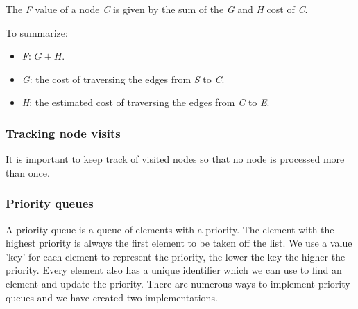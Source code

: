 \documentclass[12pt, a4paper]{article}
\begin{document}
The \textit{F} value of a node \textit{C} is given by the sum of the \textit{G}
and \textit{H} cost of \textit{C}.

To summarize:
\begin{itemize}
	\item \textit{F}: $ G + H $.
	\item \textit{G}: the cost of traversing the edges from \textit{S} to
	\textit{C}.
	\item \textit{H}: the estimated cost of traversing the edges from \textit{C}
	to \textit{E}.
\end{itemize}


\subsubsection{Tracking node visits}
\label{Tracking node visits}

It is important to keep track of visited nodes so that no node is processed more
than once.



\subsubsection{Priority queues}
\label{Priority queues}

A priority queue is a queue of elements with a priority. The element with the highest priority is always the first element to be taken off the list. We use a value 'key'  for each element to represent the priority, the lower the key the higher the priority. Every element also has a unique identifier which we can use to find an element and update the priority.  There are numerous ways to implement priority queues and we have created two implementations.
\end{document}
